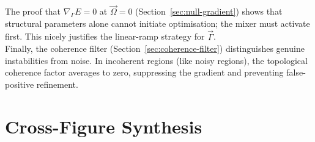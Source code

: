 \documentclass[12pt, a4paper, oneside]{report}
\begin{document}
\noindent The proof that $\nabla_{\Gamma} E = 0$ at $\vec{\Omega} = 0$ (Section~\ref{sec:null-gradient}) shows that structural parameters alone cannot initiate optimisation; the mixer must activate first. This nicely justifies the linear-ramp strategy for $\vec{\Gamma}$.\\

\noindent Finally, the coherence filter (Section~\ref{sec:coherence-filter}) distinguishes genuine instabilities from noise. In incoherent regions (like noisy regions), the topological coherence factor averages to zero, suppressing the gradient and preventing false-positive refinement.

\section{Cross-Figure Synthesis}
\end{document}
